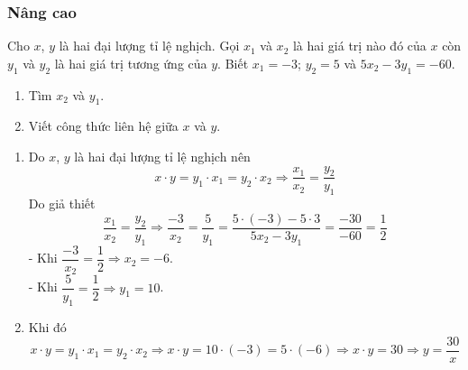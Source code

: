 \subsubsection{Nâng cao}
\begin{bt}%
Cho $x$, $y$ là hai đại lượng tỉ lệ nghịch. Gọi $x_{1}$ và $x_{2}$ là hai giá trị nào đó của $x$ còn $y_{1}$ và $y_{2}$ là hai giá trị tương ứng của $y$. Biết $x_{1} = - 3$; $y_{2} = 5$ và $5x_{2} - 3y_{1} = - 60$.
\begin{enumerate}
	\item Tìm $x_{2}$ và  $y_{1}$.
	\item Viết công thức liên hệ giữa $x$ và $y$.
\end{enumerate}
	\loigiai
	{\begin{enumerate}
			\item Do $x$, $y$ là hai đại lượng tỉ lệ nghịch nên  
			$${x}\cdot {y} = {y_{1}}\cdot {x_{1}} = {y_{2}}\cdot{x_{2}}\Rightarrow \dfrac{x_{1}}{x_{2}} = \dfrac{y_{2}}{y_{1}} $$
			Do giả thiết 
			$$\dfrac{x_{1}}{x_{2}} = \dfrac{y_{2}}{y_{1}}\Rightarrow \dfrac{- 3}{x_{2}} = \dfrac{5}{y_{1}} = \dfrac{5\cdot (- 3) - 5\cdot 3}{5x_{2} - 3y_{1}} = \dfrac{-30}{- 60} = \dfrac{1}{2}$$
			- Khi $\dfrac{- 3}{x_{2}} = \dfrac{1}{2}\Rightarrow x_{2} = - 6$.\\
			- Khi $\dfrac{5}{y_{1}} = \dfrac{1}{2}\Rightarrow y_{1} = 10$. 
			\item Khi đó $${x}\cdot {y} = {y_{1}}\cdot {x_{1}} = {y_{2}}\cdot{x_{2}}\Rightarrow {x}\cdot {y} = 10 \cdot (-3) = 5 \cdot (- 6)\Rightarrow {x}\cdot {y} = 30\Rightarrow y = \dfrac{30}{x}$$
		\end{enumerate}
}
\end{bt}

